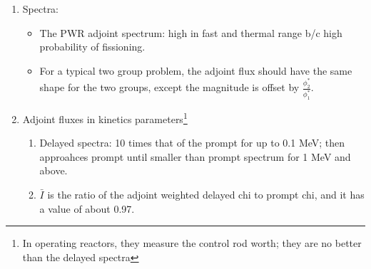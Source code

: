 \documentclass{school-22.211-notes}
\begin{document}
\begin{enumerate}
  \item Spectra: 
    \begin{itemize}
    \item The PWR adjoint spectrum: high in fast and thermal range b/c high probability of fissioning. 
    \item For a typical two group problem, the adjoint flux should have the same shape for the two groups, except the magnitude is offset by $\frac{\phi_2^*}{\phi_1^*}$. 
    \end{itemize}

\item Adjoint fluxes in kinetics parameters\footnote{In operating reactors, they measure the control rod worth; they are no better than the delayed spectra}
  \begin{enumerate}
  \item Delayed spectra: 10 times that of the prompt for up to 0.1 MeV; then approahces prompt until smaller than prompt spectrum for 1 MeV and above. 

  \item $\bar{I}$ is the ratio of the adjoint weighted delayed chi to prompt chi, and it has a value of about 0.97.
  \end{enumerate}

\end{enumerate}
\end{document}
